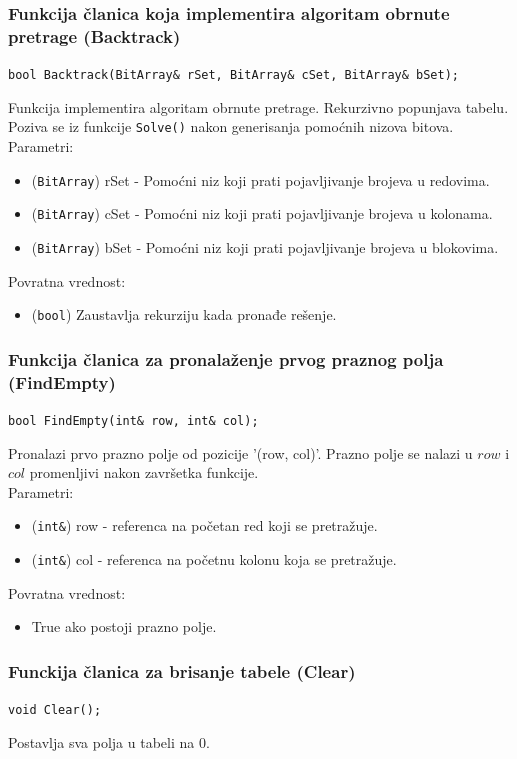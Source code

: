 \documentclass[a4paper]{article}
\begin{document}
    \subsubsection{Funkcija članica koja implementira algoritam obrnute pretrage (Backtrack)}
    {\parindent0pt
    \texttt{bool Backtrack(BitArray\& rSet, BitArray\& cSet, BitArray\& bSet);}
    }
    \par Funkcija implementira algoritam obrnute pretrage. Rekurzivno popunjava tabelu. Poziva se iz funkcije \texttt{Solve()} nakon generisanja pomoćnih nizova bitova.
    Parametri:
    \begin{itemize}
        \item (\texttt{BitArray}) rSet - Pomoćni niz koji prati pojavljivanje brojeva u redovima.
        \item (\texttt{BitArray}) cSet - Pomoćni niz koji prati pojavljivanje brojeva u kolonama.
        \item (\texttt{BitArray}) bSet - Pomoćni niz koji prati pojavljivanje brojeva u blokovima.
    \end{itemize}
    Povratna vrednost:
    \begin{itemize}
        \item (\texttt{bool}) Zaustavlja rekurziju kada pronađe rešenje.
    \end{itemize}

    \subsubsection{Funkcija članica za pronalaženje prvog praznog polja (FindEmpty)}
	\texttt{bool FindEmpty(int\& row, int\& col);}
    \par Pronalazi prvo prazno polje od pozicije '(row, col)'. Prazno polje se nalazi u $row$ i $col$ promenljivi nakon završetka funkcije.\\
    Parametri:
    \begin{itemize}
        \item (\texttt{int\&}) row - referenca na početan red koji se pretražuje.
        \item (\texttt{int\&}) col - referenca na početnu kolonu koja se pretražuje.
    \end{itemize}
    Povratna vrednost:
    \begin{itemize}
        \item True ako postoji prazno polje.
    \end{itemize}

    \subsubsection{Funckija članica za brisanje tabele (Clear)}
    \texttt{void Clear();}
    \par Postavlja sva polja u tabeli na 0.
\end{document}
